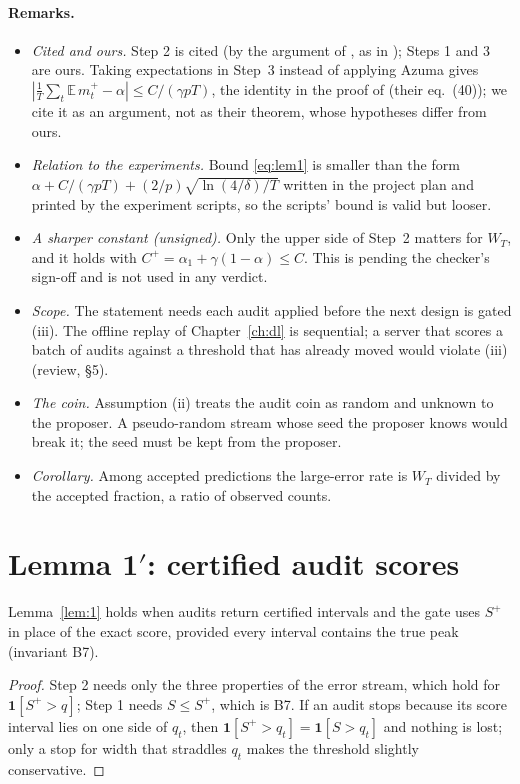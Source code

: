 \paragraph{Remarks.}
\begin{itemize}
\item \emph{Cited and ours.} Step 2 is cited (by the argument of \cite[Prop.~4.1]{gibbs2021aci},
as in \cite[Prop.~5.5]{tu2026}); Steps 1 and 3 are ours. Taking expectations in Step~3 instead of
applying Azuma gives $|\frac1T\sum_t\mathbb E\,m^+_t-\alpha|\le C/(\gamma pT)$, the identity in the
proof of \cite[Thm~5.9]{tu2026} (their eq.~(40)); we cite it as an argument, not as their theorem,
whose hypotheses differ from ours.
\item \emph{Relation to the experiments.} Bound \eqref{eq:lem1} is smaller than the form
$\alpha + C/(\gamma pT) + (2/p)\sqrt{\ln(4/\delta)/T}$ written in the project plan and printed by
the experiment scripts, so the scripts' bound is valid but looser.
\item \emph{A sharper constant (unsigned).} Only the upper side of Step~2 matters for $W_T$, and
it holds with $C^+ = \alpha_1+\gamma(1-\alpha) \le C$. This is pending the checker's sign-off and
is not used in any verdict.
\item \emph{Scope.} The statement needs each audit applied before the next design is gated
(iii). The offline replay of Chapter~\ref{ch:dl} is sequential; a server that scores a batch of
audits against a threshold that has already moved would violate (iii) (review, \S5).
\item \emph{The coin.} Assumption (ii) treats the audit coin as random and unknown to the
proposer. A pseudo-random stream whose seed the proposer knows would break it; the seed must be
kept from the proposer.
\item \emph{Corollary.} Among accepted predictions the large-error rate is $W_T$ divided by the
accepted fraction, a ratio of observed counts.
\end{itemize}

\section{Lemma 1\texorpdfstring{$'$}{'}: certified audit scores}
\begin{lemma}\label{lem:1p}
Lemma~\ref{lem:1} holds when audits return certified intervals and the gate uses $S^+$ in place
of the exact score, provided every interval contains the true peak (invariant B7).
\end{lemma}
\begin{proof}
Step 2 needs only the three properties of the error stream, which hold for
$\mathbf 1[S^+>q]$; Step 1 needs $S\le S^+$, which is B7. If an audit stops because its score
interval lies on one side of $q_t$, then $\mathbf 1[S^+>q_t]=\mathbf 1[S>q_t]$ and nothing is
lost; only a stop for width that straddles $q_t$ makes the threshold slightly conservative.
\end{proof}

